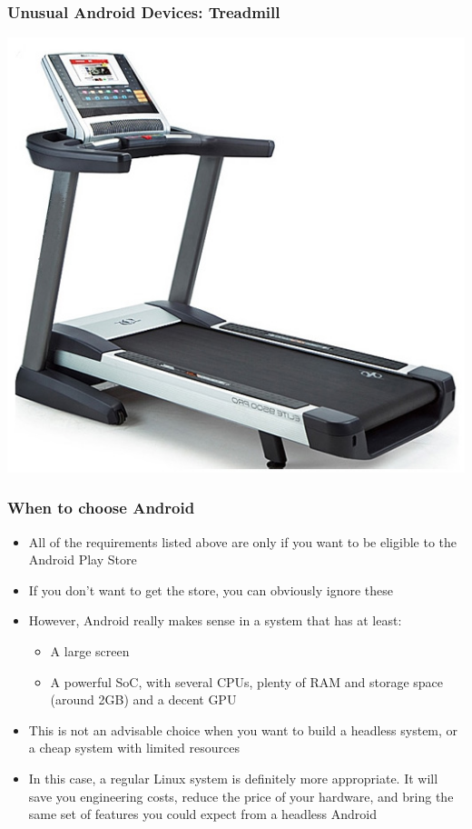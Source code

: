 \begin{frame}
  \frametitle{Unusual Android Devices: Treadmill}
  \begin{center}
    \includegraphics[width=\textwidth,height=0.7\textheight,keepaspectratio]{slides/android-introduction-hardware/nordicktrack-treadmill.jpg}
  \end{center}
\end{frame}

\begin{frame}
  \frametitle{When to choose Android}
  \begin{itemize}
  \item All of the requirements listed above are only if you want to
    be eligible to the Android Play Store
  \item If you don't want to get the store, you can obviously ignore
    these
  \item However, Android really makes sense in a system that has at
    least:
    \begin{itemize}
    \item A large screen
    \item A powerful SoC, with several CPUs, plenty of RAM and storage
      space (around 2GB) and a decent GPU
    \end{itemize}
  \item This is not an advisable choice when you want to build a
    headless system, or a cheap system with limited resources
  \item In this case, a regular Linux system is definitely more
    appropriate. It will save you engineering costs, reduce the price
    of your hardware, and bring the same set of features you could
    expect from a headless Android
  \end{itemize}
\end{frame}
